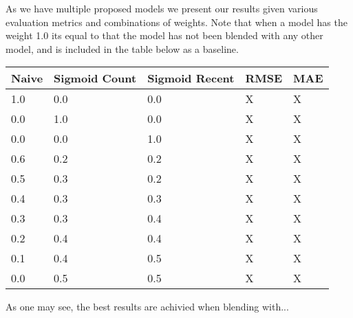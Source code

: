 As we have multiple proposed models we present our results given various
evaluation metrics and combinations of weights. Note that when a model has the
weight 1.0 its equal to that the model has not been blended with any other
model, and is included in the table below as a baseline.

\begin{table}[H]
  \centering
  \begin{tabular}{lll|ll}
    \toprule
    \textbf{Naive} &  \textbf{Sigmoid Count} & \textbf{Sigmoid Recent} &
    \textbf{RMSE} & \textbf{MAE} \\
    \midrule
    1.0  &      0.0        &      0.0       &  X   &  X  \\
    0.0  &      1.0        &      0.0       &  X   &  X  \\
    0.0  &      0.0        &      1.0       &  X   &  X  \\
    \midrule
    0.6  &      0.2        &      0.2       &  X   &  X  \\
    0.5  &      0.3        &      0.2       &  X   &  X  \\
    0.4  &      0.3        &      0.3       &  X   &  X  \\
    0.3  &      0.3        &      0.4       &  X   &  X  \\
    0.2  &      0.4        &      0.4       &  X   &  X  \\
    0.1  &      0.4        &      0.5       &  X   &  X  \\
    0.0  &      0.5        &      0.5       &  X   &  X  \\
    \bottomrule
  \end{tabular}
\end{table}

As one may see, the best results are achivied when blending with...
